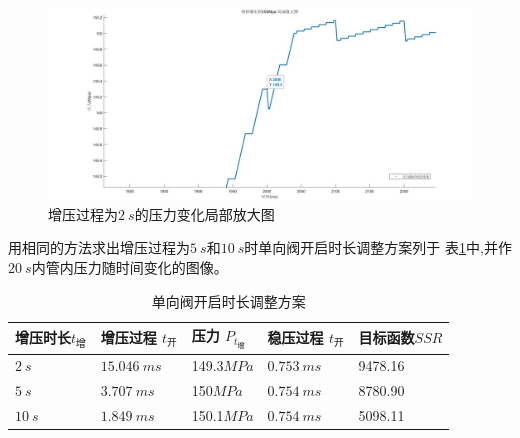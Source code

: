 \documentclass[withoutpreface,bwprint]{cumcmthesis} %
\begin{document}
    \begin{figure}[!h]
    \centering
    \includegraphics[width=.85\textwidth]{2s_m.jpg}
    \caption{增压过程为$2~s$的压力变化局部放大图}
    \label{figure5}
    \end{figure}

    \newpage

    用相同的方法求出增压过程为$5~s$和$10~s$时单向阀开启时长调整方案列于
    表\ref{table1}中,并作$20~s$内管内压力随时间变化的图像。
    \begin{longtable}[c]{p{}<{\centering}p{}<{\centering}p{}<{\centering}
    p{}<{\centering}p{}<{\centering}}
        \caption{单向阀开启时长调整方案} 
        \label{table1}\\
        \toprule[2pt]
        增压时长$t_{\text{增}}$ & 增压过程 $t_{\text{开}}$ 
        & 压力 $P_{t_{\text{增}}}$ & 稳压过程 $t_{\text{开}}$ & 目标函数$SSR$ \\ 
        \midrule[1pt]
        $2~s$  & $15.046~ms$ & 149.3$MPa$ & $0.753~ms$ & 9478.16 \\
        $5~s$  & $3.707~ms$  & 150$MPa$   & $0.754~ms$ & 8780.90 \\
        $10~s$ & $1.849~ms$  & 150.1$MPa$ & $0.754~ms$ & 5098.11 \\
    \bottomrule[1.5pt]
    \end{longtable}
\end{document}
